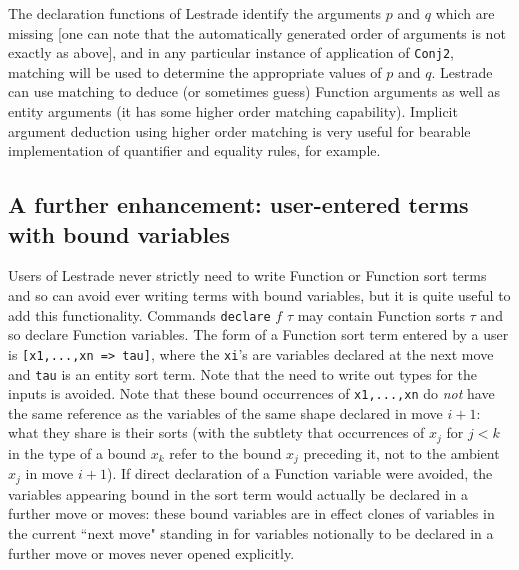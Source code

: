 \documentclass[submission,copyright,creativecommons]{eptcs}
\begin{document}
The declaration functions of Lestrade identify the arguments $p$ and $q$ which are missing [one can note that the automatically generated order of arguments is not exactly as above], and in any particular instance of application of {\tt Conj2}, matching will be used to determine the appropriate values of $p$ and $q$.  Lestrade can use matching to deduce (or sometimes guess) Function arguments as well as entity arguments (it has some higher order matching capability).  Implicit argument deduction using higher order matching is very useful for bearable implementation of quantifier and equality rules, for example.





\subsection{A further enhancement:  user-entered terms with bound variables}

Users of Lestrade never strictly need to write Function or Function sort terms and so can avoid ever writing terms with bound variables, but it is quite useful to add this functionality.  Commands {\tt declare} $f$ $\tau$ may contain Function sorts $\tau$ and so declare Function variables.  The form of a Function sort term entered by a user is {\tt [x1,...,xn => tau]}, where the {\tt xi}'s are variables declared at the next move and {\tt tau} is an entity sort term.  Note that the need to write out types for the inputs is avoided.  Note that these bound occurrences of {\tt x1,...,xn} do {\em not\/} have the same reference as the variables of the same shape declared in move $i+1$:  what they share is their sorts (with the subtlety that occurrences of $x_j$ for $j<k$ in the type of a bound $x_k$ refer to the bound $x_j$ preceding it, not to the ambient $x_j$ in move $i+1$).  If direct declaration of a Function variable were avoided, the variables appearing bound in the sort term would actually be declared in a further move or moves:  these bound variables are in effect clones of variables in the current ``next move" standing in for variables notionally to be declared in a further move or moves never opened explicitly.
\end{document}
